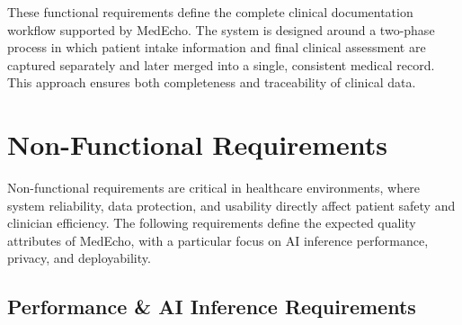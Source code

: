 These functional requirements define the complete clinical documentation workflow supported by MedEcho. The system is designed around a two-phase process in which patient intake information and final clinical assessment are captured separately and later merged into a single, consistent medical record. This approach ensures both completeness and traceability of clinical data.





\section{Non-Functional Requirements}\label{sec:analysis:nfr}

Non-functional requirements are critical in healthcare environments, where system reliability, data protection, and usability directly affect patient safety and clinician efficiency. The following requirements define the expected quality attributes of MedEcho, with a particular focus on AI inference performance, privacy, and deployability.

\subsection{Performance \& AI Inference Requirements}\label{sec:analysis:nfr:performance}

